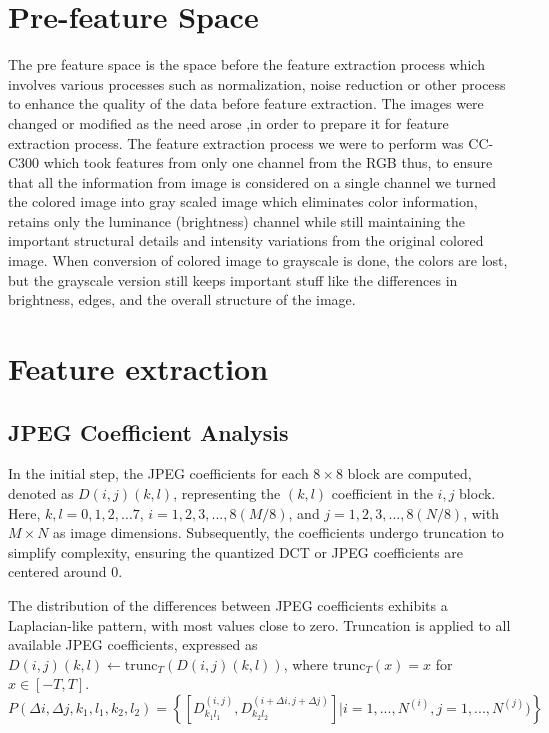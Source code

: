 \section{Pre-feature Space}
The pre feature space is the space before the feature extraction process which involves various processes such as normalization, noise reduction or other process to enhance the quality of the data before feature extraction.
The images were changed or modified as the need arose ,in order to prepare it for feature extraction process. The feature extraction process we were to perform was CC-C300 which took features from only one channel from the RGB thus, to ensure that all the information from image is considered on a single channel we turned the colored image into gray scaled image which 
eliminates color information, retains only the luminance (brightness) channel while still maintaining the important structural details and intensity variations from the original colored image. When conversion of colored image to grayscale is done, the colors are lost, but the grayscale version still keeps important stuff like the differences in brightness, edges, and the overall structure of the image.
\clearpage
\section{Feature extraction}
\subsection{JPEG Coefficient Analysis}
In the initial step, the JPEG coefficients for each $8 \times 8$ block are computed, denoted as $D(i,j)(k,l)$, representing the $(k, l)$ coefficient in the $i, j$ block. Here, $k, l = 0, 1, 2, ...7$, $i = 1, 2, 3, ..., 8(M/8)$, and $j = 1, 2, 3, ..., 8(N/8)$, with $M \times N$ as image dimensions. Subsequently, the coefficients undergo truncation to simplify complexity, ensuring the quantized DCT or JPEG coefficients are centered around 0.

The distribution of the differences between JPEG coefficients exhibits a Laplacian-like pattern, with most values close to zero. Truncation is applied to all available JPEG coefficients, expressed as $D(i,j)(k,l) \leftarrow \text{trunc}_T(D(i,j)(k,l))$, where $\text{trunc}_T(x) = x$ for $x \in [-T, T]$.
\[
    P(\Delta i, \Delta j,k_1,l_1,k_2,l_2)=\left \{ \left [ D^{(i,j)}_{k_1l_1},D^{(i+\Delta i,j+\Delta j)}_{k_2l_2} \right ] \vert i=1,...,N^{(i)}, j=1,...,N^{(j)})\right \}
\]

